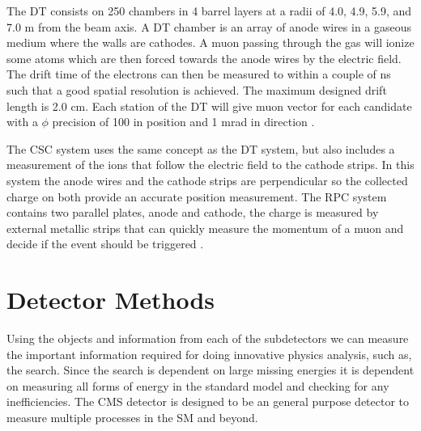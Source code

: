 The DT consists on 250 chambers in 4 barrel layers at a radii of 4.0, 4.9, 5.9, and 7.0 m from the beam axis. A DT chamber is an array of anode wires in a gaseous medium where the walls are cathodes. A muon passing through the gas will ionize some atoms which are then forced towards the anode wires by the electric field. The drift time of the electrons can then be measured to within a couple of ns such that a good spatial resolution is achieved. The maximum designed drift length is 2.0 cm. Each station of the DT will give muon vector for each candidate with a $\phi$ precision of 100 \mum{} in position and 1 mrad in direction \cite{collaboration_cms_2007}. 

The CSC system uses the same concept as the DT system, but also includes a measurement of the ions that follow the electric field to the cathode strips. In this system the anode wires and the cathode strips are perpendicular so the collected charge on both provide an accurate position measurement. The RPC system contains two parallel plates, anode and cathode, the charge is measured by external metallic strips that can quickly measure the momentum of a muon and decide if the event should be triggered \cite{collaboration_cms_2007}.

\section{Detector Methods}
\label{sec:DetMethods}

Using the objects and information from each of the subdetectors we can measure the important information required for doing innovative physics analysis, such as, the \st{} search. Since the search is dependent on large missing energies it is dependent on measuring all forms of energy in the standard model and checking for any inefficiencies. The CMS detector is designed to be an general purpose detector to measure multiple processes in the SM and beyond. 